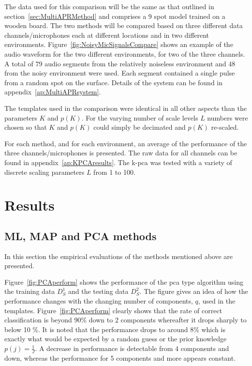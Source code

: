 The data used for this comparison will be the same as that outlined in section~\ref{sec:MultiAPRMethod} and comprises a 9 spot model trained on a wooden board. The two methods will be compared based on three different data channels/microphones each at different locations and in two different environments. Figure~\ref{fig:NoisyMicSignalsCompare} shows an example of the audio waveform for the two different environments, for two of the three channels. A total of 79 audio segments from the relatively noiseless environment and 48 from the noisy environment were used. Each segment contained a single pulse from a random spot on the surface. Details of the system can be found in appendix~\ref{ap:MultiAPRsystem}.

The templates used in the comparison were identical in all other aspects than the parameters $K$ and $p(K)$. For the varying number of scale levels $L$ numbers were chosen so that $K$ and $p(K)$ could simply be decimated and $p(K)$ re-scaled.

For each method, and for each environment, an average of the performance of the three channels/microphones is presented. The raw data for all channels can be found in appendix~\ref{ap:KPCAresults}. The \DIFdelbegin {}\DIFdelend \DIFaddbegin \gls{k-pca} \DIFaddend was tested with a variety of discrete scaling parameters $L$ from 1 to 100.

\section{Results}\label{sec:results}
\subsection{ML, MAP and PCA methods}
In this section the empirical evaluations of the methods mentioned above are presented.

Figure~\ref{fig:PCAperform} shows the performance of the \DIFdelbegin {}\DIFdelend \DIFaddbegin \gls{pca} \DIFaddend type algorithm using the training data $D^1_S$ and the testing data $D^2_S$. The figure gives an idea of how the performance changes with the changing number of components, $q$, used in the templates. Figure~\ref{fig:PCAperform} clearly shows that the rate of correct classification is beyond 90\% down to 2 components whereafter it drops \DIFdelbegin {}\DIFdelend \DIFaddbegin {}\DIFaddend sharply to below 10 \%. It is noted that the performance drops to around 8\% which is exactly what would be expected by a random guess or the prior knowledge $p(j)= \frac{1}{J}$. A decrease in performance is detectable from 4 components and down, whereas the performance for 5 components and more appears constant.

